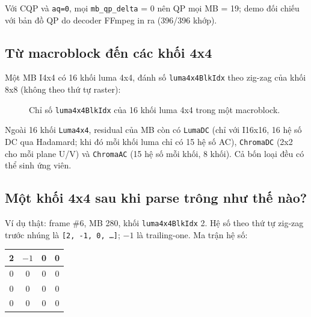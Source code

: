 \documentclass[11pt,a4paper]{article}
\begin{document}
Với CQP và \texttt{aq=0}, mọi \texttt{mb\_qp\_delta} = 0 nên QP mọi MB = 19; demo
đối chiếu với bản đồ QP do decoder FFmpeg in ra (396/396 khớp).

\subsection{Từ macroblock đến các khối 4x4}

Một MB I4x4 có 16 khối luma 4x4, đánh số \texttt{luma4x4BlkIdx} theo zig-zag của
khối 8x8 (không theo thứ tự raster):

\begin{figure}[H]
\centering
{}
\caption{Chỉ số \texttt{luma4x4BlkIdx} của 16 khối luma 4x4 trong một macroblock.}
\label{fig:block-index-grid}
\end{figure}

Ngoài 16 khối \texttt{Luma4x4}, residual của MB còn có \texttt{LumaDC} (chỉ với
I16x16, 16 hệ số DC qua Hadamard; khi đó mỗi khối luma chỉ có 15 hệ số AC),
\texttt{ChromaDC} (2x2 cho mỗi plane U/V) và \texttt{ChromaAC} (15 hệ số mỗi khối,
8 khối). Cả bốn loại đều có thể sinh ứng viên.

\subsection{Một khối 4x4 sau khi parse trông như thế nào?}

Ví dụ thật: frame \#6, MB 280, khối \texttt{luma4x4BlkIdx} 2. Hệ số theo thứ tự
zig-zag trước nhúng là \texttt{[2, -1, 0, \ldots]}; \(-1\) là trailing-one.
Ma trận hệ số:

\begin{center}
\begin{tabular}{|c|c|c|c|}
\hline
2 & \cellcolor{SoftYellow}\(-1\) & 0 & 0 \\
\hline
0 & 0 & 0 & 0 \\
\hline
0 & 0 & 0 & 0 \\
\hline
0 & 0 & 0 & 0 \\
\hline
\end{tabular}
\end{center}
\end{document}
